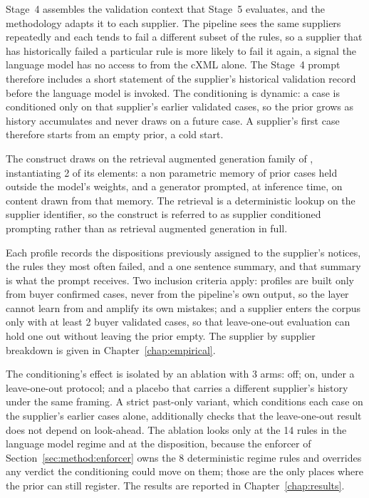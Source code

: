 Stage~4 assembles the validation context that Stage~5 evaluates, and the methodology adapts it to each supplier. The pipeline sees the same suppliers repeatedly and each tends to fail a different subset of the rules, so a supplier that has historically failed a particular rule is more likely to fail it again, a signal the language model has no access to from the cXML alone. The Stage~4 prompt therefore includes a short statement of the supplier's historical validation record before the language model is invoked. The conditioning is dynamic: a case is conditioned only on that supplier's earlier validated cases, so the prior grows as history accumulates and never draws on a future case. A supplier's first case therefore starts from an empty prior, a cold start.

The construct draws on the retrieval augmented generation family of \citet{lewis2020rag}, instantiating 2 of its elements: a non parametric memory of prior cases held outside the model's weights, and a generator prompted, at inference time, on content drawn from that memory. The retrieval is a deterministic lookup on the supplier identifier, so the construct is referred to as supplier conditioned prompting rather than as retrieval augmented generation in full.

Each profile records the dispositions previously assigned to the supplier's notices, the rules they most often failed, and a one sentence summary, and that summary is what the prompt receives. Two inclusion criteria apply: profiles are built only from buyer confirmed cases, never from the pipeline's own output, so the layer cannot learn from and amplify its own mistakes; and a supplier enters the corpus only with at least 2 buyer validated cases, so that leave-one-out evaluation can hold one out without leaving the prior empty. The supplier by supplier breakdown is given in Chapter~\ref{chap:empirical}.

The conditioning's effect is isolated by an ablation with 3 arms: off; on, under a leave-one-out protocol; and a placebo that carries a different supplier's history under the same framing. A strict past-only variant, which conditions each case on the supplier's earlier cases alone, additionally checks that the leave-one-out result does not depend on look-ahead. The ablation looks only at the 14 rules in the language model regime and at the disposition, because the enforcer of Section~\ref{sec:method:enforcer} owns the 8 deterministic regime rules and overrides any verdict the conditioning could move on them; those are the only places where the prior can still register. The results are reported in Chapter~\ref{chap:results}.


